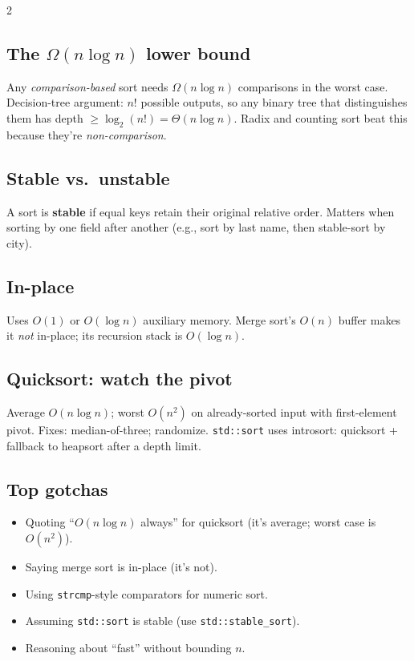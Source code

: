 \documentclass[10pt]{article}
\begin{document}
\begin{multicols}{2}
\subsection*{The $\Omega(n \log n)$ lower bound}
Any \emph{comparison-based} sort needs $\Omega(n \log n)$ comparisons in
the worst case. Decision-tree argument: $n!$ possible outputs, so any
binary tree that distinguishes them has depth $\geq \log_2(n!) = \Theta(n
\log n)$. Radix and counting sort beat this because they're
\emph{non-comparison}.

\subsection*{Stable vs.\ unstable}
A sort is \textbf{stable} if equal keys retain their original relative
order. Matters when sorting by one field after another (e.g., sort by
last name, then stable-sort by city).

\subsection*{In-place}
Uses $O(1)$ or $O(\log n)$ auxiliary memory. Merge sort's $O(n)$ buffer
makes it \emph{not} in-place; its recursion stack is $O(\log n)$.

\subsection*{Quicksort: watch the pivot}
Average $O(n \log n)$; worst $O(n^2)$ on already-sorted input with
first-element pivot. Fixes: median-of-three; randomize. \texttt{std::sort}
uses introsort: quicksort + fallback to heapsort after a depth limit.

\subsection*{Top gotchas}
\begin{itemize}
    \item Quoting ``$O(n \log n)$ always'' for quicksort (it's average;
    worst case is $O(n^2)$).
    \item Saying merge sort is in-place (it's not).
    \item Using \texttt{strcmp}-style comparators for numeric sort.
    \item Assuming \texttt{std::sort} is stable (use
    \texttt{std::stable\_sort}).
    \item Reasoning about ``fast'' without bounding $n$.
\end{itemize}

\end{multicols}
\end{document}
